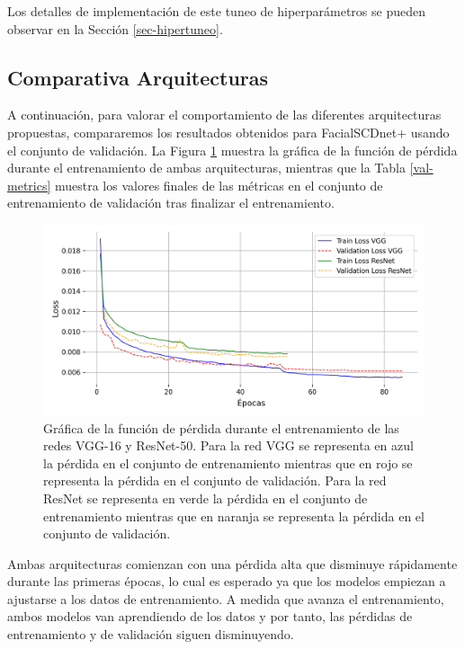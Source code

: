 Los detalles de implementación de este tuneo de hiperparámetros se pueden observar en la Sección \ref{sec-hipertuneo}.

\subsection{Comparativa Arquitecturas}

A continuación, para valorar el comportamiento de las diferentes arquitecturas propuestas, compararemos los resultados obtenidos para FacialSCDnet+ usando el conjunto de validación. La Figura \ref{fig30} muestra la gráfica de la función de pérdida durante el entrenamiento de ambas arquitecturas, mientras que la Tabla \ref{val-metrics} muestra los valores finales de las métricas en el conjunto de entrenamiento de validación tras finalizar el entrenamiento.

\begin{figure}[h]
	\centering
	\includegraphics[scale=0.6]{imagenes/cap5/train_val_loss.png}
	\caption[Gráfica de pérdida en entrenamiento y validación.]{Gráfica de la función de pérdida durante el entrenamiento de las redes VGG-16 y ResNet-50. Para la red VGG se representa en azul la pérdida en el conjunto de entrenamiento mientras que en rojo se representa la pérdida en el conjunto de validación. Para la red ResNet se representa en verde la pérdida en el conjunto de entrenamiento mientras que en naranja se representa la pérdida en el conjunto de validación.}
	\label{fig30}
\end{figure}

Ambas arquitecturas comienzan con una pérdida alta que disminuye rápidamente durante las primeras épocas, lo cual es esperado ya que los modelos empiezan a ajustarse a los datos de entrenamiento. A medida que avanza el entrenamiento, ambos modelos van aprendiendo de los datos y por tanto, las pérdidas de entrenamiento y de validación siguen disminuyendo. 


